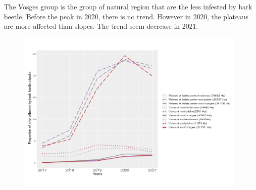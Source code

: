 \documentclass[3p,procedia]{elsarticle}
\begin{document}
The Vosges group is the group of natural region that are the less infested by bark beetle. 
Before the peak in 2020, there is no trend. However in 2020, the plateaus are more affected than slopes.
The trend seem decrease in 2021.
  

 
 


\begin{figure}
\centering
	\includegraphics[width=\textwidth]{SS_ardenne_vosges_plaines.png}
	\label{ss_sco}
\end{figure}
\end{document}
